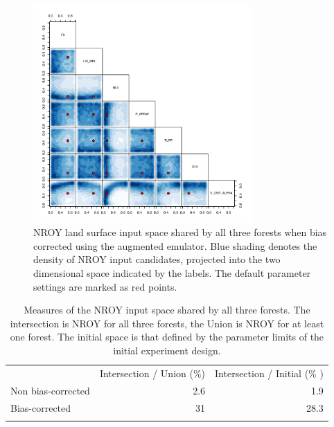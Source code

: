 \documentclass[gmd, manuscript]{copernicus}
\begin{document}
\begin{figure}[t]
\includegraphics[width=8.3cm]{../graphics/best_inputs_all_bc.pdf}
\caption{NROY land surface input space shared by all three forests when bias corrected using the augmented emulator. Blue shading denotes the density of NROY input candidates, projected into the two dimensional space indicated by the labels. The default parameter settings are marked as red points.
}
\label{fig:best_inputs_all_bc}
\end{figure}




\begin{table}[t]
\caption{Measures of the NROY input space shared by all three forests. The intersection is NROY for all three forests, the Union is NROY for at least one forest. The initial space is that defined by the parameter limits of the initial experiment design.}
\begin{tabular}{lrr}
\tophline

    & Intersection / Union (\%) & Intersection / Initial (\% ) \\
\middlehline
 Non bias-corrected & 2.6 &   1.9 \\
Bias-corrected  & 31 & 28.3 \\
\bottomhline
\end{tabular}
\belowtable{} %
\label{tab:intersection}
\end{table}
\end{document}
